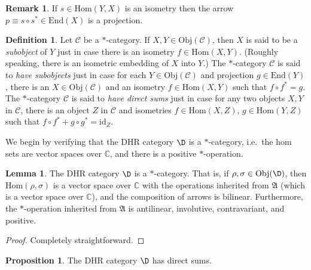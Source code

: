 \documentclass[12pt]{article}
\newcommand{\alg}[1]{\mathfrak{#1}}
\theoremstyle{definition}
\newtheorem{prop}[thm]{Proposition}
\newtheorem{lemma}[thm]{Lemma}
\theoremstyle{definition}
\newtheorem{defn}[thm]{Definition}
\newtheorem{note}[thm]{Remark}
\theoremstyle{remark}
\newcommand{\Obj}{\mathrm{Obj}}
\def\2#1{{\mathcal #1}}
\def\7#1{{\mathbb #1}}
\newcommand{\Hom}{\mathrm{Hom}}
\newcommand{\End}{\mathrm{End}}
\def\id{\mathrm{id}}
\begin{document}
\begin{note} If $s \in \Hom (Y,X)$ is an isometry then
  the arrow $p\equiv s\circ s^*\in \End (X)$ is a
  projection. \end{note}

\begin{defn} Let $\2C$ be a $*$-category.  If $X,Y\in
  \Obj (\2C )$, then $X$ is said to be a
  \emph{subobject} of $Y$ just in case there is an
  isometry $f\in \Hom (X,Y)$.  (Roughly speaking, there
  is an isometric embedding of $X$ into $Y$.)  The
  $*$-category $\2C$ is said to \emph{have subobjects}
  just in case for each $Y\in \Obj (\2C )$ and
  projection $g\in \End (Y)$, there is an $X\in \Obj
  (\2C )$ and an isometry $f\in \Hom (X,Y)$ such that
  $f\circ f^*=g$. The $*$-category $\2C$ is said to
  \emph{have direct sums} just in case for any two
  objects $X,Y$ in $\2C$, there is an object $Z$ in
  $\2C$ and isometries $f\in \Hom (X,Z)$, $g\in \Hom
  (Y,Z)$ such that $f\circ f^*+g\circ g^*=\id _Z$.
\end{defn}

We begin by verifying that the DHR category $\D$ is a $*$-category, i.e.\ the hom
sets are vector spaces over $\7C$, and there is a positive $*$-operation.

\begin{lemma} The DHR category $\D$ is a $*$-category.  That is, if $\rho ,\sigma \in
  \Obj (\D )$, then $\Hom (\rho ,\sigma )$ is a vector space over $\7C$ with the
  operations inherited from $\alg{A}$ (which is a vector space over $\7C$), and the
  composition of arrows is bilinear.  Furthermore, the $*$-operation inherited from
  $\alg{A}$ is antilinear, involutive, contravariant, and positive.
\end{lemma}

\begin{proof} Completely straightforward.  \end{proof}


\begin{prop} The DHR category $\D$ has direct sums.  \end{prop}
\end{document}
